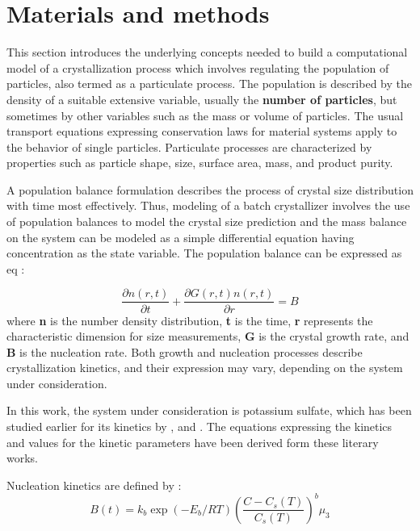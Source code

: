 \documentclass[3p,times,authoryear]{elsarticle}
\begin{document}
\section{Materials and methods} \label{model}


This section introduces the underlying concepts needed to build a computational model of a crystallization process which involves regulating the population of particles, also termed as a particulate process. 
The population is described by the density of a suitable extensive variable, usually the \textbf{number of particles}, but sometimes by other variables such as the mass or volume of particles. The usual transport equations expressing conservation laws for material systems apply to the behavior of single particles. Particulate processes are characterized by properties such as particle shape, size, surface area, mass, and product purity. \par
A population balance formulation describes the process of crystal size distribution with time most effectively. Thus, modeling of a batch crystallizer involves the use of population balances to model the crystal size prediction and the mass balance on the system can be modeled as a simple differential equation having concentration as the state variable.
The population balance can be expressed as eq :

\begin{equation} \label{populationbalance}
\frac{\partial{n(r,t)}}{\partial{t}} + \frac{\partial{G(r,t)n(r,t)}}{\partial{r}} = B  
\end{equation}
where \textbf{n} is the number density distribution, \textbf{t} is the time, \textbf{r} represents the characteristic dimension for size measurements, \textbf{G} is the crystal growth rate, and \textbf{B} is the nucleation rate. Both growth and nucleation processes describe crystallization kinetics, and their expression may vary, depending on the system under consideration.

In this work, the system under consideration is potassium sulfate, which has been studied earlier for its kinetics by \cite{hu}, \cite{shi} and \cite{paeng}. The equations expressing the kinetics and values for the kinetic parameters have been derived form these literary works. 

Nucleation kinetics are defined by :
\begin{equation}
B(t) = k_{b}\exp{\left(-E_{b}/RT \right)}\left(\frac{C - C_{s}(T)}{C_{s}(T)}\right)^{b}\mu_{3}
\end{equation}  
\end{document}
